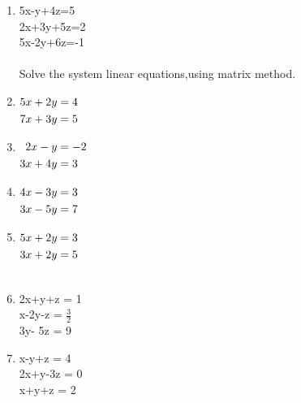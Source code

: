 \documentclass[journal,12pt,twocolumn]{IEEEtran}
\renewcommand\thesection{\arabic{section}}
\begin{document}
\begin{enumerate}[label=\thesection.\arabic*.,ref=\thesection.\theenumi]
\\
\solution 
%
\item 5x-y+4z=5 \\ 2x+3y+5z=2 \\ 5x-2y+6z=-1\\
\\
\solution
%
Solve the system linear equations,using matrix method.
\item 
$\begin{alignedat}[t]{2}
5x+2y&=4 \\ 7x+3y&=5
\end{alignedat}$
\\
\solution
%
\item 
$\begin{alignedat}[t]{2}
2x-y&=-2 \\ 3x+4y&=3
\end{alignedat}$
\\
\solution
%
\item $\begin{alignedat}[t]{2}
4x-3y&=3 \\ 3x-5y&=7
\end{alignedat}$
\\
\solution
%
\item $\begin{alignedat}[t]{2}
5x+2y&=3 \\ 3x+2y&=5
\end{alignedat}$\\
\\
\solution
%
\item 2x+y+z = 1 \\ x-2y-z = $\frac{3}{2}$ \\ 3y- 5z = 9\\
\item x-y+z = 4 \\ 2x+y-3z = 0 \\ x+y+z = 2\\

\end{enumerate}
\end{document}
